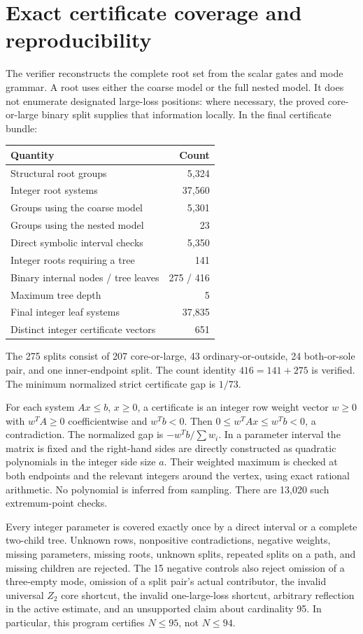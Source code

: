 \documentclass[11pt,a4paper]{article}
\begin{document}
\section{Exact certificate coverage and reproducibility}
The verifier reconstructs the complete root set from the scalar gates
and mode grammar. A root uses either the coarse model or the full
nested model. It does not enumerate designated large-loss positions:
where necessary, the proved core-or-large binary split supplies that
information locally. In the final certificate bundle:
\begin{center}
\begin{tabular}{lr}\toprule
Quantity&Count\\\midrule
Structural root groups&5,324\\
Integer root systems&37,560\\
Groups using the coarse model&5,301\\
Groups using the nested model&23\\
Direct symbolic interval checks&5,350\\
Integer roots requiring a tree&141\\
Binary internal nodes / tree leaves&275 / 416\\
Maximum tree depth&5\\
Final integer leaf systems&37,835\\
Distinct integer certificate vectors&651\\\bottomrule
\end{tabular}
\end{center}
The 275 splits consist of 207 core-or-large, 43 ordinary-or-outside,
24 both-or-sole pair, and one inner-endpoint split. The count identity
$416=141+275$ is verified. The minimum normalized strict certificate
gap is $1/73$.

For each system $Ax\le b$, $x\ge0$, a certificate is an integer row
weight vector $w\ge0$ with $w^TA\ge0$ coefficientwise and $w^Tb<0$.
Then $0\le w^TAx\le w^Tb<0$, a contradiction. The normalized gap is
$-w^Tb/\sum w_i$. In a parameter interval the matrix is fixed and
the right-hand sides are directly constructed as quadratic polynomials
in the integer side size $a$. Their weighted maximum is checked at
both endpoints and the relevant integers around the vertex, using
exact rational arithmetic. No polynomial is inferred from sampling.
There are 13,020 such extremum-point checks.

Every integer parameter is covered exactly once by a direct interval
or a complete two-child tree. Unknown rows, nonpositive contradictions,
negative weights, missing parameters, missing roots, unknown splits,
repeated splits on a path, and missing children are rejected. The
15 negative controls also reject omission of a three-empty mode,
omission of a split pair's actual contributor, the invalid universal
$Z_2$ core shortcut, the invalid one-large-loss shortcut, arbitrary
reflection in the active estimate, and an unsupported claim about
cardinality 95. In particular, this program certifies $N\le95$, not
$N\le94$.
\end{document}
